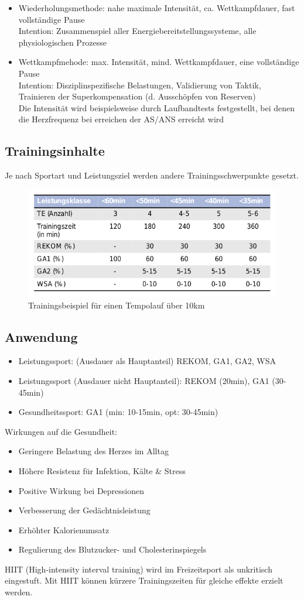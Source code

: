 \begin{itemize}
\item Wiederholungsmethode: nahe maximale Intensität, ca. Wettkampfdauer, fast vollständige Pause\\
    Intention: Zusammenspiel aller Energiebereitstellungssysteme, alle physiologischen Prozesse
\item Wettkampfmehode: max. Intensität, mind. Wettkampfdauer, eine vollständige Pause \\
    Intention: Disziplinspezifische Belastungen, Validierung von Taktik, Trainieren der Superkompensation (d. Ausschöpfen von Reserven)\\
    Die Intensität wird beispielsweise durch Laufbandtests festgestellt, bei denen die Herzfrequenz bei erreichen der AS/ANS erreicht wird
\end{itemize}

\subsection{Trainingsinhalte}
Je nach Sportart und Leistungsziel werden andere Trainingsschwerpunkte gesetzt.
\begin{figure}[H]
    \centering
    \includegraphics[width=.5\textwidth]{pictures/trainingsbeispiel_tempolauf.png}
    \caption{Trainingsbeispiel für einen Tempolauf über 10km}
\end{figure}

\subsection{Anwendung}
\begin{itemize}
    \item Leistungssport: (Ausdauer als Hauptanteil) REKOM, GA1, GA2, WSA
    \item Leistungssport (Ausdauer nicht Hauptanteil): REKOM (20min), GA1 (30-45min)
    \item Gesundheitssport: GA1 (min: 10-15min, opt: 30-45min)
\end{itemize}

Wirkungen auf die Gesundheit:
\begin{itemize}
    \item Geringere Belastung des Herzes im Alltag
    \item Höhere Resistenz für Infektion, Kälte \& Stress
    \item Positive Wirkung bei Depressionen
    \item Verbesserung der Gedächtnisleistung
    \item Erhöhter Kalorienumsatz
    \item Regulierung des Blutzucker- und Cholesterinspiegels
\end{itemize}
HIIT (High-intensity interval training) wird im Freizeitsport als unkritisch eingestuft. 
Mit HIIT können kürzere Trainingszeiten für gleiche effekte erzielt werden.

